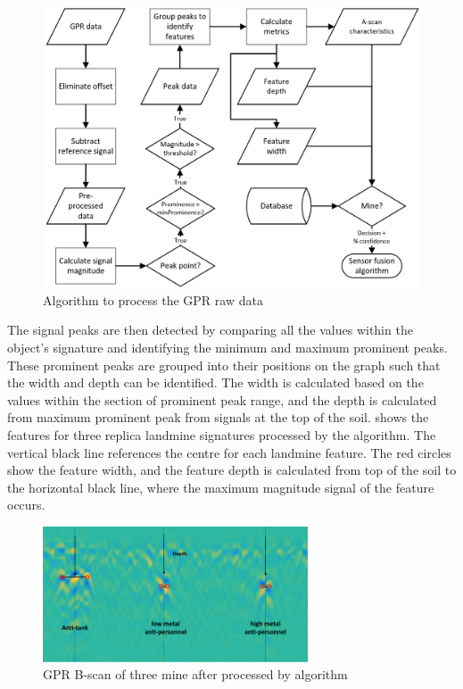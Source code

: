 \documentclass[main.tex]{subfiles}
\begin{document}
\begin{figure}[ht]
\includegraphics[width=\textwidth]{4-DetailedDesign/GPRflow.PNG}
\centering
\caption{Algorithm to process the GPR raw data}
\end{figure}

The signal peaks are then detected by comparing all the values within the object’s signature and identifying the minimum and maximum prominent peaks. These prominent peaks are grouped into their positions on the graph such that the width and depth can be identified. The width is calculated based on the values within the section of prominent peak range, and the depth is calculated from maximum prominent peak from signals at the top of the soil.  shows the features for three replica landmine signatures processed by the algorithm. The vertical black line references the centre for each landmine feature. The red circles show the feature width, and the feature depth is calculated from top of the soil to the horizontal black line, where the maximum magnitude signal of the feature occurs.

\begin{figure}[ht]
\includegraphics[width=0.7\textwidth]{4-DetailedDesign/GPRalg.PNG}
\centering
\caption{GPR B-scan of three mine after processed by algorithm}
\end{figure}
\end{document}
